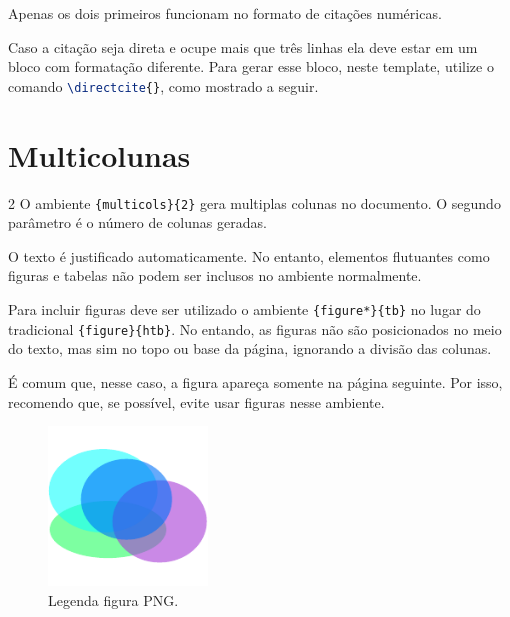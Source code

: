     Apenas os dois primeiros funcionam no formato de citações numéricas.

    Caso a citação seja direta e ocupe mais que três linhas ela deve estar em um bloco com formatação diferente.
    Para gerar esse bloco, neste template, utilize o comando \lstinline[language=TeX,style=code]|\directcite{}|, como mostrado a seguir.




\section{Multicolunas}
\label{sec:multicolunas}


    \begin{multicols}{2}
        O ambiente \lstinline[language=TeX,style=code]|{multicols}{2}| gera multiplas colunas no documento.
        O segundo parâmetro é o número de colunas geradas.

        O texto é justificado automaticamente.
        No entanto, elementos flutuantes como figuras e tabelas não podem ser inclusos no ambiente normalmente.

        Para incluir figuras deve ser utilizado o ambiente \lstinline[language=TeX,style=code]|{figure*}{tb}| no lugar do tradicional \lstinline[language=TeX,style=code]|{figure}{htb}|.
        No entando, as figuras não são posicionados no meio do texto, mas sim no topo ou base da página, ignorando a divisão das colunas.

        É comum que, nesse caso, a figura apareça somente na página seguinte.
        Por isso, recomendo que, se possível, evite usar figuras nesse ambiente.


        \begin{figure}[bt]
            \centering
            \includegraphics[width=120pt]{images/figure.pdf}
            \caption{Legenda figura PNG.}
            \label{fig:coluna_dupla}
        \end{figure}
        
        \lipsum[1][1-10]
    \end{multicols}

